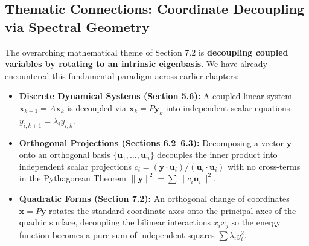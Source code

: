 \documentclass[11pt, letterpaper]{article}
\theoremstyle{definition}
\theoremstyle{remark}
\begin{document}
\subsection{Thematic Connections: Coordinate Decoupling via Spectral Geometry}
The overarching mathematical theme of Section 7.2 is \textbf{decoupling coupled variables by rotating to an intrinsic eigenbasis}. We have already encountered this fundamental paradigm across earlier chapters:
\begin{itemize}
    \item \textbf{Discrete Dynamical Systems (Section 5.6):} A coupled linear system $\mathbf{x}_{k+1} = A\mathbf{x}_k$ is decoupled via $\mathbf{x}_k = P\mathbf{y}_k$ into independent scalar equations $y_{i, k+1} = \lambda_i y_{i, k}$.
    \item \textbf{Orthogonal Projections (Sections 6.2--6.3):} Decomposing a vector $\mathbf{y}$ onto an orthogonal basis $\{\mathbf{u}_1, \dots, \mathbf{u}_n\}$ decouples the inner product into independent scalar projections $c_i = (\mathbf{y} \cdot \mathbf{u}_i)/(\mathbf{u}_i \cdot \mathbf{u}_i)$ with no cross-terms in the Pythagorean Theorem $\|\mathbf{y}\|^2 = \sum \|c_i \mathbf{u}_i\|^2$.
    \item \textbf{Quadratic Forms (Section 7.2):} An orthogonal change of coordinates $\mathbf{x} = P\mathbf{y}$ rotates the standard coordinate axes onto the principal axes of the quadric surface, decoupling the bilinear interactions $x_i x_j$ so the energy function becomes a pure sum of independent squares $\sum \lambda_i y_i^2$.
\end{itemize}
\end{document}
